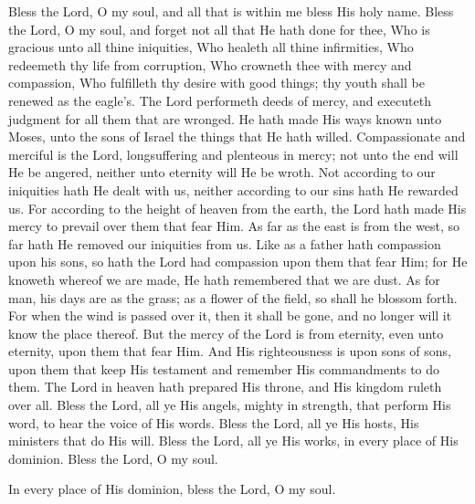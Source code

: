 \documentclass[
  14pt,
  letterpaper,
  openright,
  twocolumn,
  twoside]{memoir}
\begin{document}
Bless the Lord, O my soul, and all that is within me bless His holy name. Bless the Lord, O my soul, and forget not all that He hath done for thee, Who is gracious unto all thine iniquities, Who healeth all thine infirmities, Who redeemeth thy life from corruption, Who crowneth thee with mercy and compassion, Who fulfilleth thy desire with good things; thy youth shall be renewed as the eagle's. The Lord performeth deeds of mercy, and executeth judgment for all them that are wronged. He hath made His ways known unto Moses, unto the sons of Israel the things that He hath willed. Compassionate and merciful is the Lord, longsuffering and plenteous in mercy; not unto the end will He be angered, neither unto eternity will He be wroth. Not according to our iniquities hath He dealt with us, neither according to our sins hath He rewarded us. For according to the height of heaven from the earth, the Lord hath made His mercy to prevail over them that fear Him. As far as the east is from the west, so far hath He removed our iniquities from us. Like as a father hath compassion upon his sons, so hath the Lord had compassion upon them that fear Him; for He knoweth whereof we are made, He hath remembered that we are dust. As for man, his days are as the grass; as a flower of the field, so shall he blossom forth. For when the wind is passed over it, then it shall be gone, and no longer will it know the place thereof. But the mercy of the Lord is from eternity, even unto eternity, upon them that fear Him. And His righteousness is upon sons of sons, upon them that keep His testament and remember His commandments to do them. The Lord in heaven hath prepared His throne, and His kingdom ruleth over all. Bless the Lord, all ye His angels, mighty in strength, that perform His word, to hear the voice of His words. Bless the Lord, all ye His hosts, His ministers that do His will. Bless the Lord, all ye His works, in every place of His dominion. Bless the Lord, O my soul.

In every place of His dominion, bless the Lord, O my soul.

\end{document}
